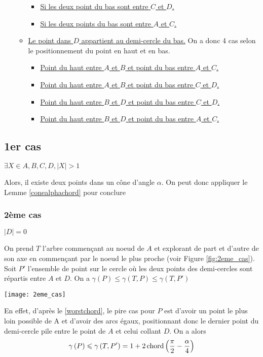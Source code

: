 \begin{itemize}
\begin{itemize}
\begin{itemize}
			\item \hyperref[5cas12]{Si les deux point du bas sont entre $C$ et $D$.}
			\item \hyperref[5cas13]{Si les deux points du bas sont entre $A$ et $C$.}
		\end{itemize}
		\item \hyperref[5cas2]{Le point dans $D$ appartient au demi-cercle du bas.}
		On a donc 4 cas selon le positionnement du point en haut et en bas.
		\begin{itemize}
			\item \hyperref[5cas21]{Point du haut entre $A$ et $B$ et point du bas entre $A$ et $C$.}
			\item \hyperref[5cas22]{Point du haut entre $A$ et $B$ et point du bas entre $C$ et $D$.}
			\item \hyperref[5cas23]{Point du haut entre $B$ et $D$ et point du bas entre $C$ et $D$.}
			\item \hyperref[5cas24]{Point du haut entre $B$ et $D$ et point du bas entre $A$ et $C$.}
		\end{itemize}
	\end{itemize}
\end{itemize}

\subsection*{1er cas}\label{1cas} $\exists X \in {A,B,C,D}, |X| > 1$

Alors, il existe deux points dans un cône d'angle $\alpha$. On peut donc appliquer le Lemme \ref{conealphachord} pour conclure

\subsubsection*{2ème cas}\label{2cas} $|D| = 0$

On prend $T$ l'arbre commençant au noeud de $A$ et explorant de part et d'autre
de son axe en commençant par le noeud le plus proche (voir Figure \ref{fig:2eme_cas}).
Soit $P'$ l'ensemble de point sur le cercle où les deux points des demi-cercles sont répartis entre $A$ et $D$.
On a $\gamma\left(P\right) \leq  \gamma\left(T, P\right) \leq \gamma\left(T, P'\right)$

  \texttt{[image: 2eme\_cas]}\label{fig:2eme_cas}

En effet, d'après le \cref{worstchord}, le pire cas pour $P$ est d'avoir un point le plus loin possible de A et d'avoir des arcs égaux, positionnant donc le dernier point du demi-cercle pile entre le point de $A$ et celui collant $D$. On a alors
$$\gamma\left(P\right) \leqslant \gamma\left(T, P'\right) = 1 + 2\operatorname{chord}\left(\frac{\pi}{2} -
  \frac{\alpha}{4}\right)$$

